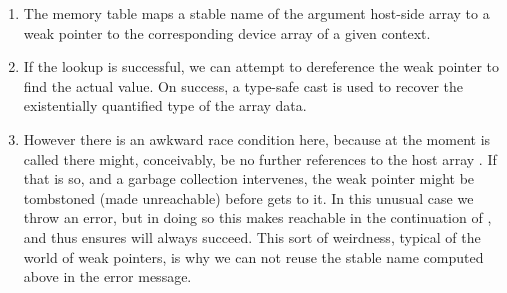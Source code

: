 %
\begin{enumerate}
\item The memory table maps a stable name of the argument host-side array to a
    weak pointer to the corresponding device array of a given context.

\item If the lookup is successful, we can attempt to dereference the weak
    pointer to find the actual value. On success, a type-safe cast is used to
    recover the existentially quantified type of the array data.

\item However there is an awkward race condition here, because at the moment
     is called there might, conceivably, be no further
    references to the host array . If that is so, and a garbage
    collection intervenes, the weak pointer might be tombstoned (made
    unreachable) before  gets to it. In this unusual case we
    throw an error, but in doing so this makes  reachable in the
    continuation of , and thus ensures  will
    always succeed. This sort of weirdness, typical of the world of weak
    pointers, is why we can not reuse the stable name  computed above
    in the error message.
\end{enumerate}

